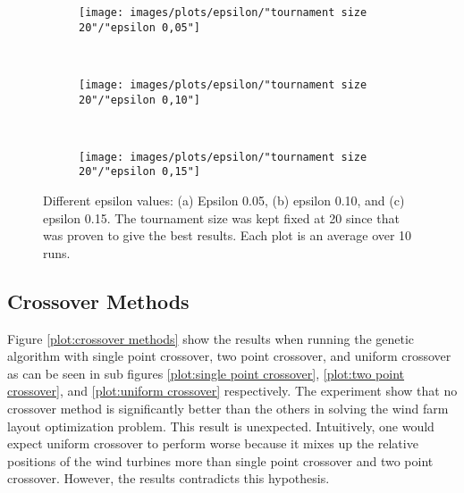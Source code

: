 \begin{figure}[h!]
    \centering
    \begin{subfigure}[b]{0.31\textwidth}
        \texttt{[image: images/plots/epsilon/"tournament size 20"/"epsilon 0,05"]}
        \caption{}
        \hfill
        \label{plot:epsilon 0.05}
    \end{subfigure}
    ~
    \begin{subfigure}[b]{0.31\textwidth}
        \texttt{[image: images/plots/epsilon/"tournament size 20"/"epsilon 0,10"]}
        \caption{}
        \hfill
        \label{plot:epsilon 0.10}
    \end{subfigure}
    ~
    \begin{subfigure}[b]{0.31\textwidth}
        \texttt{[image: images/plots/epsilon/"tournament size 20"/"epsilon 0,15"]}
        \caption{}
        \hfill
        \label{plot:epsilon 0.15}
    \end{subfigure}
    \caption{Different epsilon values: (a) Epsilon 0.05, (b) epsilon 0.10, and (c) epsilon 0.15. The tournament size was kept fixed at 20 since that was proven to give the best results. Each plot is an average over 10 runs.}
    \label{plot:epsilon}
\end{figure}


\subsection{Crossover Methods}
Figure \ref{plot:crossover methods} show the results when running the genetic algorithm with single point crossover, two point crossover, and uniform crossover as can be seen in sub figures \ref{plot:single point crossover}, \ref{plot:two point crossover}, and \ref{plot:uniform crossover} respectively. The experiment show that no crossover method is significantly better than the others in solving the wind farm layout optimization problem. This result is unexpected. Intuitively, one would expect uniform crossover to perform worse because it mixes up the relative positions of the wind turbines more than single point crossover and two point crossover. However, the results contradicts this hypothesis. \\


